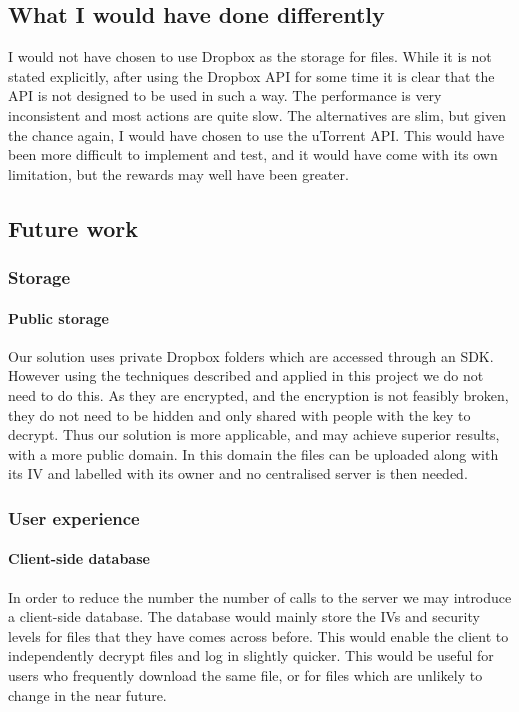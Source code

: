 \documentclass[12pt, titlepage]{article}
\begin{document}
\subsection{What I would have done differently}
I would not have chosen to use Dropbox as the storage for files. While it is not stated explicitly, after using the Dropbox API for some time it is clear that the API is not designed to be used in such a way. The performance is very inconsistent and most actions are quite slow.
\newline \indent The alternatives are slim, but given the chance again, I would have chosen to use the uTorrent API. This would have been more difficult to implement and test, and it would have come with its own limitation, but the rewards may well have been greater.

\subsection{Future work}
\subsubsection*{Storage}
\paragraph*{Public storage} Our solution uses private Dropbox folders which are accessed through an SDK. However using the techniques described and applied in this project we do not need to do this. As they are encrypted, and the encryption is not feasibly broken, they do not need to be hidden and only shared with people with the key to decrypt. Thus our solution is more applicable, and may achieve superior results, with a more public domain. In this domain the files can be uploaded along with its IV and labelled with its owner and no centralised server is then needed.
\subsubsection*{User experience}
\paragraph*{Client-side database} In order to reduce the number the number of calls to the server we may introduce a client-side database. The database would mainly store the IVs and security levels for files that they have comes across before. This would enable the client to independently decrypt files and log in slightly quicker. This would be useful for users who frequently download the same file, or for files which are unlikely to change in the near future.
\end{document}
